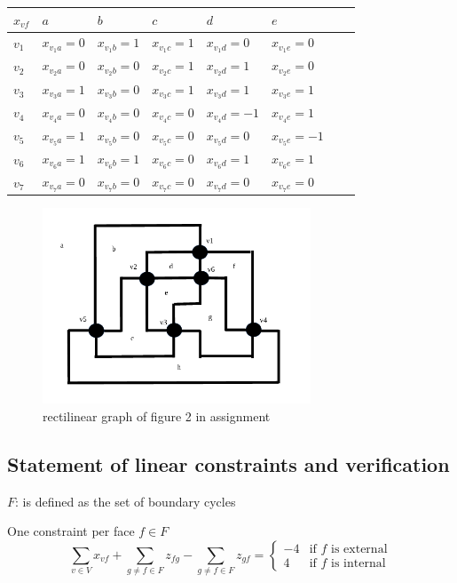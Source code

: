 \begin{tabular}{l|lllllll}
$x_{vf}$ & $a$ & $b$ & $c$ & $d$ & $e$ \\ \hline
$v_1$ & $x_{v_1a} = 0 $ & $x_{v_1b} = 1 $ & $x_{v_1c} = 1 $ & $x_{v_1d} = 0 $ & $x_{v_1e} = 0 $ \\
$v_2$ & $x_{v_2a} = 0 $ & $x_{v_2b} = 0 $ & $x_{v_2c} = 1 $ & $x_{v_2d} = 1 $ & $x_{v_2e} = 0 $ \\
$v_3$ & $x_{v_3a} = 1 $ & $x_{v_3b} = 0 $ & $x_{v_3c} = 1 $ & $x_{v_3d} = 1 $ & $x_{v_3e} = 1 $ \\
$v_4$ & $x_{v_4a} = 0 $ & $x_{v_4b} = 0 $ & $x_{v_4c} = 0 $ & $x_{v_4d} = -1 $ & $x_{v_4e} = 1 $ \\
$v_5$ & $x_{v_5a} = 1 $ & $x_{v_5b} = 0 $ & $x_{v_5c} = 0 $ & $x_{v_5d} = 0 $ & $x_{v_5e} = -1 $ \\
$v_6$ & $x_{v_6a} = 1 $ & $x_{v_6b} = 1 $ & $x_{v_6c} = 0 $ & $x_{v_6d} = 1 $ & $x_{v_6e} = 1 $ \\
$v_7$ & $x_{v_7a} = 0 $ & $x_{v_7b} = 0 $ & $x_{v_7c} = 0 $ & $x_{v_7d} = 0 $ & $x_{v_7e} = 0 $ \\
\end{tabular}



\begin{figure}[h!]
 \centering
 \includegraphics[keepaspectratio=true, width=80mm]{img/rectilinear_graph.png}
 \caption{rectilinear graph of figure 2 in assignment}
\end{figure}

\pagebreak

\subsection{Statement of linear constraints and verification}
$F$: is defined as the set of boundary cycles

One constraint per face $f \in F$
$$\sum_{v \in V}{x_{vf}} + \sum_{g \neq f \in F}{z_{fg}} - \sum_{g \neq f \in F}{z_{gf}} =
\begin{cases} -4 & \text{if $f$ is external} \\ 4 & \text{if $f$ is internal}\end{cases}
$$

